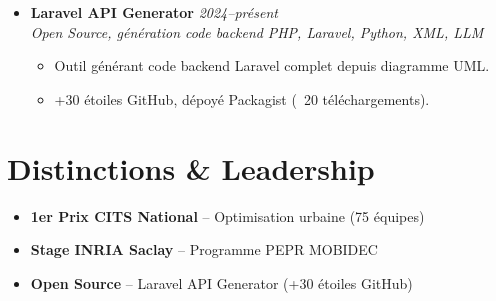 \documentclass[a4paper,11pt]{article}
\begin{document}
\begin{itemize}[leftmargin=0.5cm, nosep]
    \item \textbf{Laravel API Generator} \hfill \textit{2024--pr\'esent} \\
    \textit{Open Source, g\'en\'eration code backend} \hfill \textit{PHP, Laravel, Python, XML, LLM}
    \vspace{-2pt}
    \begin{itemize}[leftmargin=0.4cm, nosep, label=\tiny$\bullet$]
        \item \small{Outil g\'en\'erant code backend Laravel complet depuis diagramme UML.}
        \item \small{+30 \'etoiles GitHub, d\'epoy\'e Packagist (~20 t\'el\'echargements).}
    \end{itemize}
\end{itemize}

\section{Distinctions \& Leadership}
\begin{itemize}[leftmargin=0.5cm, nosep]
    \item \textbf{1er Prix CITS National} -- Optimisation urbaine (75 \'equipes)
    \item \textbf{Stage INRIA Saclay} -- Programme PEPR MOBIDEC
    \item \textbf{Open Source} -- Laravel API Generator (+30 \'etoiles GitHub)
\end{itemize}
\end{document}
